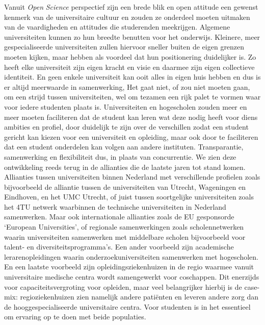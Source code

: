 \documentclass[smallauthor, chapterhaspagenum, nochapterinheader, pagenuminheader,  bigchapnum,medium2, tocpages,  garamond, titleinheader]{jote-book}
\begin{document}
	Vanuit \emph{Open }\emph{Science} perspectief zijn een brede blik en open attitude een gewenst kenmerk van de universitaire cultuur en zouden ze onderdeel moeten uitmaken van de vaardigheden en attitudes die studerenden meekrijgen. Algemene universiteiten kunnen zo hun breedte benutten voor het onderwijs. Kleinere, meer gespecialiseerde universiteiten zullen hiervoor sneller buiten de eigen grenzen moeten kijken, maar hebben als voordeel dat hun positionering duidelijker is. Zo heeft elke universiteit zijn eigen kracht en visie en daarmee zijn eigen collectieve identiteit. En geen enkele universiteit kan ooit alles in eigen huis hebben en dus is er altijd meerwaarde in samenwerking, Het gaat niet, of zou niet moeten gaan, om een strijd tussen universiteiten, wel om tezamen een rijk palet te vormen waar voor iedere studenten plaats is. Universiteiten en hogescholen zouden meer en meer moeten faciliteren dat de student kan leren wat deze nodig heeft voor diens ambities en profiel, door duidelijk te zijn over de verschillen zodat een student gericht kan kiezen voor een universiteit en opleiding, maar ook door te faciliteren dat een student onderdelen kan volgen aan andere instituten. Transparantie, samenwerking en flexibiliteit dus, in plaats van concurrentie. We zien deze ontwikkeling reeds terug in de allianties die de laatste jaren tot stand komen. Allianties tussen universiteiten binnen Nederland met verschillende profielen zoals bijvoorbeeld de alliantie tussen de universiteiten van Utrecht, Wageningen en Eindhoven, en het UMC Utrecht, of juist tussen soortgelijke universiteiten zoals het 4TU netwerk waarbinnen de technische universiteiten in Nederland samenwerken. Maar ook internationale allianties zoals de EU gesponsorde ‘European Universities', of regionale samenwerkingen zoals scholennetwerken waarin universiteiten samenwerken met middelbare scholen bijvoorbeeld voor talent- en diversiteitsprogramma's. Een ander voorbeeld zijn academische lerarenopleidingen waarin onderzoekuniversiteiten samenwerken met hogescholen. En een laatste voorbeeld zijn opleidingsziekenhuizen in de regio waarmee vanuit universitaire medische centra wordt samengewerkt voor coschappen. Dit enerzijds voor capaciteitsvergroting voor opleiden, maar veel belangrijker hierbij is de case-mix: regioziekenhuizen zien namelijk andere patiënten en leveren andere zorg dan de hooggespecialiseerde universitaire centra. Voor studenten is in het essentieel om ervaring op te doen met beide populaties.
\end{document}
